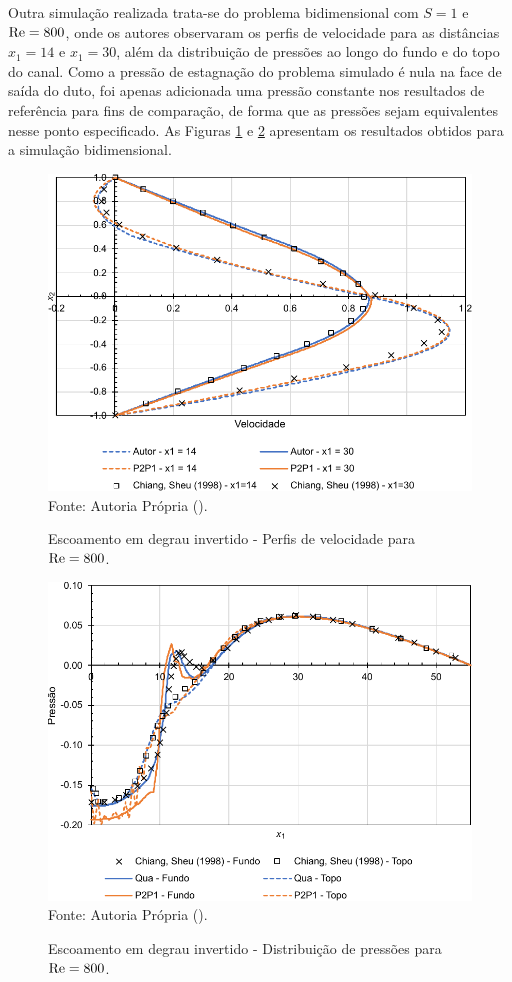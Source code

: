 Outra simulação realizada trata-se do problema bidimensional com $S=1$ e $\mathrm{Re}=800$, onde os autores observaram os perfis de velocidade para as distâncias $x_1=14$ e $x_1=30$, além da distribuição de pressões ao longo do fundo e do topo do canal. Como a pressão de estagnação do problema simulado é nula na face de saída do duto, foi apenas adicionada uma pressão constante nos resultados de referência para fins de comparação, de forma que as pressões sejam equivalentes nesse ponto especificado. As Figuras \ref{fig:BFS800-vel} e \ref{fig:BFS800-pre} apresentam os resultados obtidos para a simulação bidimensional.

\begin{figure}[h!]
    \centering
    \caption{Escoamento em degrau invertido - Perfis de velocidade para $\mathrm{Re}=800$.}
    \includegraphics[width=.6\linewidth]{Figuras/backwardFacingStep/resultado2D-2.pdf}
    \\Fonte: Autoria Própria (\the\year).
    \label{fig:BFS800-vel}
\end{figure}

\begin{figure}[h!]
    \centering
    \caption{Escoamento em degrau invertido - Distribuição de pressões para $\mathrm{Re}=800$.}
    \includegraphics[width=.6\linewidth]{Figuras/backwardFacingStep/resultado2D-1.pdf}
    \\Fonte: Autoria Própria (\the\year).
    \label{fig:BFS800-pre}
\end{figure}

